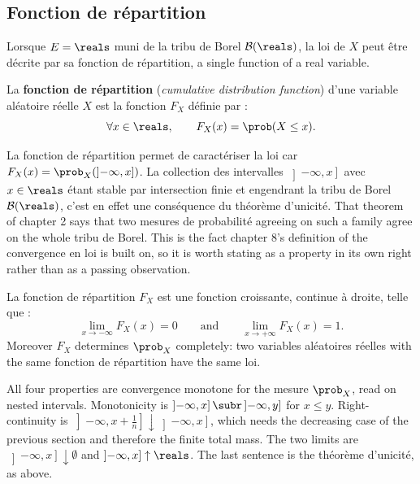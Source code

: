 \subsection{Fonction de répartition}

Lorsque $E = \reals$ muni de la tribu de Borel $\mathcal{B}(\reals)$, la loi de
$X$ peut être décrite par sa fonction de répartition, a single function of a real
variable.

\begin{definition}
  La \textbf{fonction de répartition} (\textit{cumulative distribution function})
  d'une variable aléatoire réelle $X$ est la fonction $F_{X}$ définie par :
  \[
    \forall x \in \reals, \qquad F_{X}(x) = \prob(X \leq x).
  \]
\end{definition}

La fonction de répartition permet de caractériser la loi car
$F_{X}(x) = \prob_{X}(\left]-\infty,x\right])$. La collection des intervalles
$\left]-\infty,x\right]$ avec $x \in \reals$ étant stable par intersection finie
et engendrant la tribu de Borel $\mathcal{B}(\reals)$, c'est en effet une
conséquence du théorème d'unicité. That theorem of chapter 2 says that two
mesures de probabilité agreeing on such a family agree on the whole tribu de
Borel. This is the fact chapter 8's definition of the convergence en loi is built
on, so it is worth stating as a property in its own right rather than as a
passing observation.

\begin{prop}
  La fonction de répartition $F_{X}$ est une fonction croissante, continue à
  droite, telle que :
  \[
    \lim_{x \to -\infty} F_{X}(x) = 0
    \qquad\text{and}\qquad
    \lim_{x \to +\infty} F_{X}(x) = 1 .
  \]
  Moreover $F_{X}$ determines $\prob_{X}$ completely: two variables aléatoires
  réelles with the same fonction de répartition have the same loi.
\end{prop}

\begin{remark}
  All four properties are convergence monotone for the mesure $\prob_{X}$, read
  on nested intervals. Monotonicity is
  $\left]-\infty,x\right] \subr \left]-\infty,y\right]$ for $x \leq y$.
  Right-continuity is
  $\left]-\infty,x+\tfrac1n\right] \downarrow \left]-\infty,x\right]$, which needs
  the decreasing case of the previous section and therefore the finite total mass.
  The two limits are
  $\left]-\infty,x\right] \downarrow \emptyset$ and
  $\left]-\infty,x\right] \uparrow \reals$. The last sentence is the théorème
  d'unicité, as above.
\end{remark}

